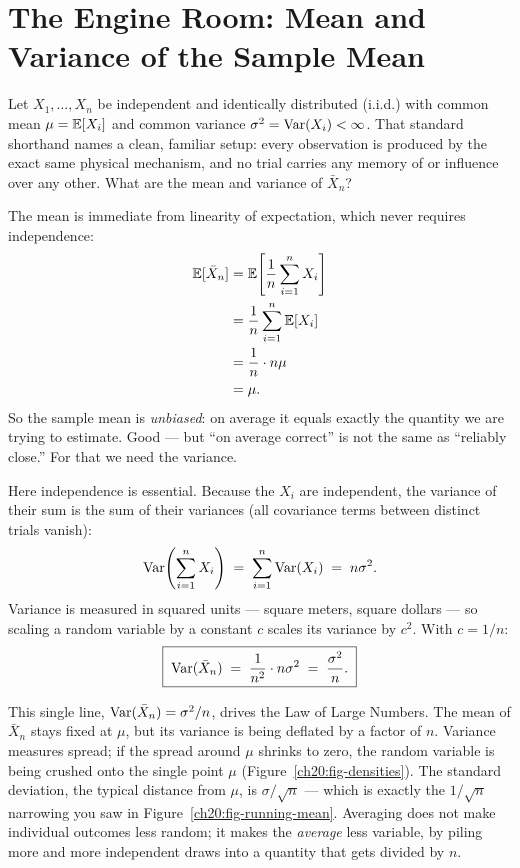 \section{The Engine Room: Mean and Variance of the Sample Mean}
\label{ch20:engine}

Let $X_1, \dots, X_n$ be independent and identically distributed (i.i.d.) with common mean $\mu = \operatorname{\mathbb{E}}[X_i]$ and common variance $\sigma^2 = \operatorname{Var}(X_i) < \infty$. That standard shorthand names a clean, familiar setup: every observation is produced by the exact same physical mechanism, and no trial carries any memory of or influence over any other. What are the mean and variance of $\bar X_n$?

The mean is immediate from linearity of expectation, which never requires independence:
\begin{align*}
  \operatorname{\mathbb{E}}[\bar X_n] &= \operatorname{\mathbb{E}}\!\left[\frac1n \sum_{i=1}^n X_i\right] \\
  &= \frac1n \sum_{i=1}^n \operatorname{\mathbb{E}}[X_i] \\
  &= \frac1n \cdot n\mu \\
  &= \mu.
\end{align*}
So the sample mean is \emph{unbiased}: on average it equals exactly the quantity we are trying to estimate. Good --- but ``on average correct'' is not the same as ``reliably close.'' For that we need the variance.

Here independence is essential. Because the $X_i$ are independent, the variance of their sum is the sum of their variances (all covariance terms between distinct trials vanish):
\[
  \operatorname{Var}\!\left(\sum_{i=1}^n X_i\right) \;=\; \sum_{i=1}^n \operatorname{Var}(X_i) \;=\; n\sigma^2.
\]
Variance is measured in squared units --- square meters, square dollars --- so scaling a random variable by a constant $c$ scales its variance by $c^2$. With $c = 1/n$:
\[
  \boxed{\;\operatorname{Var}(\bar X_n) \;=\; \frac{1}{n^2}\cdot n\sigma^2 \;=\; \frac{\sigma^2}{n}.\;}
\]

\begin{happeningbox}
This single line, $\operatorname{Var}(\bar X_n) = \sigma^2/n$, drives the Law of Large Numbers. The mean of $\bar X_n$ stays fixed at $\mu$, but its variance is being deflated by a factor of $n$. Variance measures spread; if the spread around $\mu$ shrinks to zero, the random variable is being crushed onto the single point $\mu$ (Figure~\ref{ch20:fig-densities}). The standard deviation, the typical distance from $\mu$, is $\sigma/\sqrt n$ --- which is exactly the $1/\sqrt n$ narrowing you saw in Figure~\ref{ch20:fig-running-mean}. Averaging does not make individual outcomes less random; it makes the \emph{average} less variable, by piling more and more independent draws into a quantity that gets divided by $n$.
\end{happeningbox}

